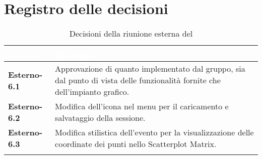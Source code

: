 \section{Registro delle decisioni}
{
\renewcommand{\arraystretch}{1.5}
\centering
\begin{longtable}{C{3cm} C{9cm}}
\textcolor{white}{\textbf{Codice}}&
\textcolor{white}{\textbf{Decisione}}\\	
\endhead
		
\textbf{Esterno-6.1} & Approvazione di quanto implementato dal gruppo, sia dal punto di vista delle funzionalità fornite che dell'impianto grafico. \\
\textbf{Esterno-6.2} & Modifica dell'icona nel menu per il caricamento e salvataggio della sessione. \\
\textbf{Esterno-6.3} & Modifica stilistica dell'evento per la visualizzazione delle coordinate dei punti nello Scatterplot Matrix. \\

\caption{Decisioni della riunione esterna del \Data{}}
		
\end{longtable}
}
